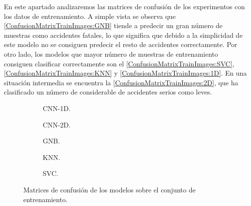     En este apartado analizaremos las matrices de confusión de los experimentos con los datos de entrenamiento. A simple vista se observa que  \eqref{ConfusionMatrixTrainImages:GNB} tiende a predecir un gran número de muestras como accidentes fatales, lo que significa que debido a la simplicidad de este modelo no se consiguen predecir el resto de accidentes correctamente. Por otro lado, los modelos que mayor número de muestras de entrenamiento consiguen clasificar correctamente son el  \eqref{ConfusionMatrixTrainImages:SVC},  \eqref{ConfusionMatrixTrainImages:KNN} y  \eqref{ConfusionMatrixTrainImages:1D}. En una situación intermedia se encuentra la  \eqref{ConfusionMatrixTrainImages:2D}, que ha clasificado un número de considerable de accidentes serios como leves.

    \begin{figure}[H]
        \centering
        \begin{subfigure}{0.4\textwidth}
            
            \caption{CNN-1D.}
            \label{ConfusionMatrixTrainImages:1D}
        \end{subfigure}
        \hspace{1mm}
        \begin{subfigure}{0.4\textwidth}
            
            \caption{CNN-2D.} 
            \label{ConfusionMatrixTrainImages:2D}
        \end{subfigure}
        \vspace*{0.1 mm}
        \begin{subfigure}{0.4\textwidth}
            
            \caption{GNB.}
            \label{ConfusionMatrixTrainImages:GNB}
        \end{subfigure}
        \hspace{1mm}
        \begin{subfigure}{0.4\textwidth}
            
            \caption{KNN.}
            \label{ConfusionMatrixTrainImages:KNN}
        \end{subfigure}
        \vspace*{0.1 mm}
        \begin{subfigure}{1\textwidth}
            \centering
            
            \caption{SVC.}
            \label{ConfusionMatrixTrainImages:SVC}
        \end{subfigure}
        \caption{Matrices de confusión de los modelos sobre el conjunto de entrenamiento.}
        \label{ConfusionMatrixTrainImages}
     \end{figure}


